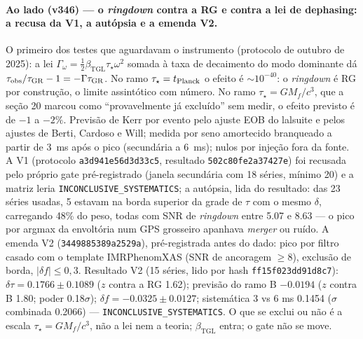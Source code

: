 \documentclass[11pt]{article}
\newcommand{\bTGL}{\beta_{\mathrm{TGL}}}\newcommand{\Msun}{M_{\odot}}\newcommand{\TGL}{\mathrm{TGL}}
\theoremstyle{definition}\newtheorem{deriv}{Derivação}
\begin{document}
\paragraph*{Ao lado (v346) --- o \emph{ringdown} contra a RG e contra a lei de dephasing: a recusa da V1, a autópsia e a emenda V2.} O primeiro dos testes que aguardavam o instrumento (protocolo de outubro de 2025): a lei $\Gamma_\omega=\tfrac12\bTGL\tau_\star\omega^2$ somada à taxa de decaimento do modo dominante dá $\tau_{\rm obs}/\tau_{\rm GR}-1=-\Gamma\tau_{\rm GR}$. No ramo $\tau_\star=t_{\rm Planck}$ o efeito é $\sim10^{-40}$: o \emph{ringdown} é RG por construção, o limite assintótico com número. No ramo $\tau_\star=GM_f/c^3$, que a seção 20 marcou como ``provavelmente já excluído'' sem medir, o efeito previsto é de $-1$ a $-2\%$. Previsão de Kerr por evento pelo ajuste EOB do lalsuite e pelos ajustes de Berti, Cardoso e Will; medida por seno amortecido branqueado a partir de $3$~ms após o pico (secundária a $6$~ms); nulos por injeção fora da fonte. A V1 (protocolo \texttt{a3d941e56d3d33c5}, resultado \texttt{502c80fe2a37427e}) foi recusada pelo próprio gate pré-registrado (janela secundária com 18 séries, mínimo 20) e a matriz leria \texttt{INCONCLUSIVE\_SYSTEMATICS}; a autópsia, lida do resultado: das 23 séries usadas, 5 estavam na borda superior da grade de $\tau$ com o mesmo $\delta$, carregando 48\% do peso, todas com SNR de \emph{ringdown} entre 5.07 e 8.63 --- o pico por argmax da envoltória num GPS grosseiro apanhava \emph{merger} ou ruído. A emenda V2 (\texttt{3449885389a2529a}), pré-registrada antes do dado: pico por filtro casado com o template IMRPhenomXAS (SNR de ancoragem $\ge8$), exclusão de borda, $|\delta f|\le0{,}3$. Resultado V2 (15 séries, lido por hash \texttt{ff15f023dd91d8c7}): $\delta\tau=0.1766\pm0.1089$ ($z$ contra a RG 1.62); previsão do ramo B $-0.0194$ ($z$ contra B 1.80; poder 0.18$\sigma$); $\delta f=-0.0325\pm0.0127$; sistemática 3 vs 6 ms 0.1454 ($\sigma$ combinada 0.2066) --- \texttt{INCONCLUSIVE\_SYSTEMATICS}. O que se exclui ou não é a escala $\tau_\star=GM_f/c^3$, não a lei nem a teoria; $\bTGL$ entra; o gate não se move.
\end{document}
